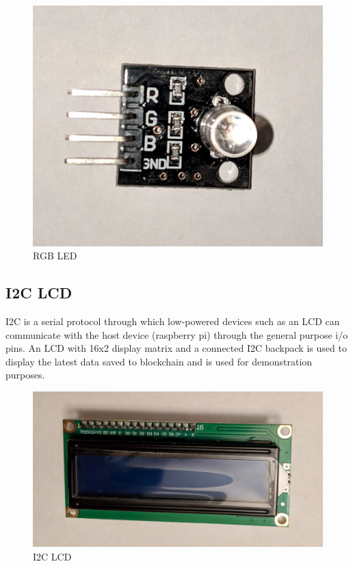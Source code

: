 \documentclass[11pt,openright]{report}
\begin{document}
\begin{figure}
    \centering
    \includegraphics[scale=0.1]{images/rgb_led.jpg}
    \caption{RGB LED}
    \label{fig:rgb_led}
\end{figure}

\subsection{I2C LCD}
I2C is a serial protocol through which low-powered devices such as an LCD can communicate with the host device (raspberry pi) through the general purpose i/o pins. 
An LCD with 16x2 display matrix and a connected I2C backpack is used to display the latest data saved to blockchain and is used for demonstration purposes.

\begin{figure}
    \centering
    \includegraphics[scale=0.1]{images/i2c_lcd.jpg}
    \caption{I2C LCD}
    \label{fig:i2c_lcd}
\end{figure}
\end{document}
